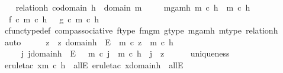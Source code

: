 \begin{isabellebody}
\ \ \isamarkupfalse%
\ relation{\isacharunderscore}{\kern0pt}h{\isacharcolon}{\kern0pt}\ {\isachardoublequoteopen}codomain\ h{}\ {\isacharequal}{\kern0pt}\ domain\ m{\isachardoublequoteclose}\ \isanewline
\ \ \isamarkupfalse%
\ m{\isacharunderscore}{\kern0pt}ga{\isacharunderscore}{\kern0pt}mh{\isacharcolon}{\kern0pt}\ {\isachardoublequoteopen}m\ {\isasymcirc}\isactrlsub c\ h{}\ {\isacharequal}{\kern0pt}\ m\ {\isasymcirc}\isactrlsub c\ h{}{\isachardoublequoteclose}\ \ \ \isanewline
\ \ \isamarkupfalse%
\ \ {\isachardoublequoteopen}f\ {\isasymcirc}\isactrlsub c\ m\ {\isasymcirc}\isactrlsub c\ h{}\ {\isacharequal}{\kern0pt}\ \ g\ {\isasymcirc}\isactrlsub c\ m\ {\isasymcirc}\isactrlsub c\ h{}{\isachardoublequoteclose}\isanewline
\ \ \ \ \isamarkupfalse%
\ cfunc{\isacharunderscore}{\kern0pt}type{\isacharunderscore}{\kern0pt}def\ comp{\isacharunderscore}{\kern0pt}associative\ f{\isacharunderscore}{\kern0pt}type\ fm{\isacharunderscore}{\kern0pt}gm\ g{\isacharunderscore}{\kern0pt}type\ m{\isacharunderscore}{\kern0pt}ga{\isacharunderscore}{\kern0pt}mh\ m{\isacharunderscore}{\kern0pt}type\ relation{\isacharunderscore}{\kern0pt}h\ \isamarkupfalse%
\ auto\isanewline
\ \ \isamarkupfalse%
\ \isamarkupfalse%
\ z\ \ {\isachardoublequoteopen}z{\isacharcolon}{\kern0pt}\ domain{\isacharparenleft}{\kern0pt}h{}{\isacharparenright}{\kern0pt}\ {\isasymrightarrow}\ E\ {\isasymand}\ m\ {\isasymcirc}\isactrlsub c\ z\ {\isacharequal}{\kern0pt}\ m\ {\isasymcirc}\isactrlsub c\ h{}\ {\isasymand}\ \isanewline
\ \ \ \ {\isacharparenleft}{\kern0pt}{\isasymforall}\ j{\isachardot}{\kern0pt}\ j{\isacharcolon}{\kern0pt}domain{\isacharparenleft}{\kern0pt}h{}{\isacharparenright}{\kern0pt}\ {\isasymrightarrow}\ E\ {\isasymand}\ \ m\ {\isasymcirc}\isactrlsub c\ j\ {\isacharequal}{\kern0pt}\ m\ {\isasymcirc}\isactrlsub c\ h{}\ {\isasymlongrightarrow}\ j\ {\isacharequal}{\kern0pt}\ z{\isacharparenright}{\kern0pt}{\isachardoublequoteclose}\isanewline
\ \ \ \ \isamarkupfalse%
\ uniqueness\ \isamarkupfalse%
\ {\isacharparenleft}{\kern0pt}erule{\isacharunderscore}{\kern0pt}tac\ x{\isacharequal}{\kern0pt}{\isachardoublequoteopen}m\ {\isasymcirc}\isactrlsub c\ h{}{\isachardoublequoteclose}\ \ allE{\isacharcomma}{\kern0pt}\ erule{\isacharunderscore}{\kern0pt}tac\ x{\isacharequal}{\kern0pt}{\isachardoublequoteopen}domain{\isacharparenleft}{\kern0pt}h{}{\isacharparenright}{\kern0pt}{\isachardoublequoteclose}\ \ allE{\isacharcomma}{\kern0pt}\isanewline

\end{isabellebody}
